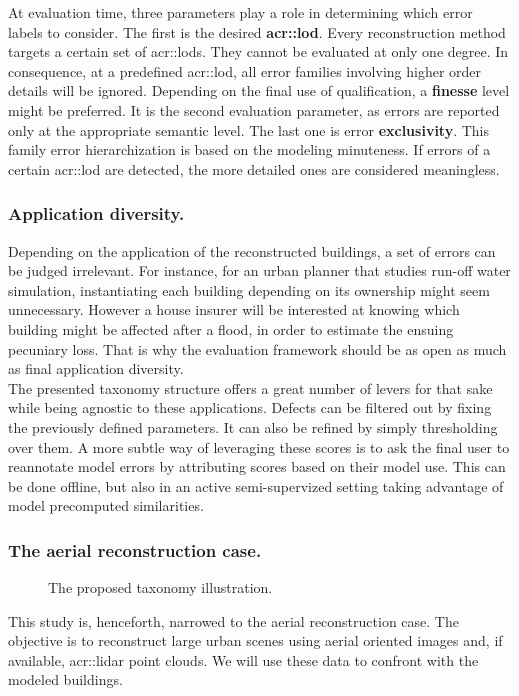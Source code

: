\documentclass[runningheads]{llncs}
\begin{document}
At evaluation time, three parameters play a role in determining which error labels to consider. The first is the desired \textbf{\acrlong{acr::lod}}. Every reconstruction method targets a certain set of \glspl{acr::lod}. They cannot be evaluated at only one degree. In consequence, at a predefined \acrshort{acr::lod}, all error families involving higher order details will be ignored. Depending on the final use of qualification, a \textbf{finesse} level might be preferred. It is the second evaluation parameter, as errors are reported only at the appropriate semantic level. The last one is error \textbf{exclusivity}. This family error hierarchization is based on the modeling minuteness. If errors of a certain \acrshort{acr::lod} are detected, the more detailed ones are considered meaningless.

\subsubsection{Application diversity.}
Depending on the application of the reconstructed buildings, a set of errors can be judged irrelevant. For instance, for an urban planner that studies run-off water simulation, instantiating each building depending on its ownership might seem unnecessary. However a house insurer will be interested at knowing which building might be affected after a flood, in order to estimate the ensuing pecuniary loss. That is why the evaluation framework should be as open as much as final application diversity.\\

The presented taxonomy structure offers a great number of levers for that sake while being agnostic to these applications. Defects can be filtered out by fixing the previously defined parameters. It can also be refined by simply thresholding over them. A more subtle way of leveraging these scores is to ask the final user to reannotate model errors by attributing scores based on their model use. This can be done offline, but also in an active semi-supervized setting taking advantage of model precomputed similarities.\\

\subsubsection{The aerial reconstruction case.}
  \begin{figure}
        \begin{center}
            
            \caption{\label{fig::pipeline} The proposed taxonomy illustration. }
        \end{center}
    \end{figure}
This study is, henceforth, narrowed to the aerial reconstruction case. The objective is to reconstruct large urban scenes using aerial oriented images and, if available, \acrshort{acr::lidar} point clouds. We will use these data  to confront with the modeled buildings.\\
\end{document}
